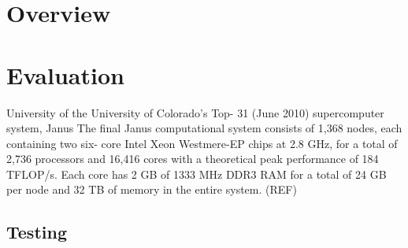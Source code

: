\documentclass{article}
\begin{document}
\section{Overview}

\section{Evaluation}
University of the University of Colorado's Top-
31 (June 2010) supercomputer system, Janus
The final Janus computational
system consists of 1,368 nodes, each containing two six-
core Intel Xeon Westmere-EP chips at 2.8 GHz, for a total
of 2,736 processors and 16,416 cores with a theoretical
peak performance of 184 TFLOP/s. Each core has 2
GB of 1333 MHz DDR3 RAM for a total of 24 GB per
node and 32 TB of memory in the entire system. (REF)

\subsection{Testing}
\end{document}
